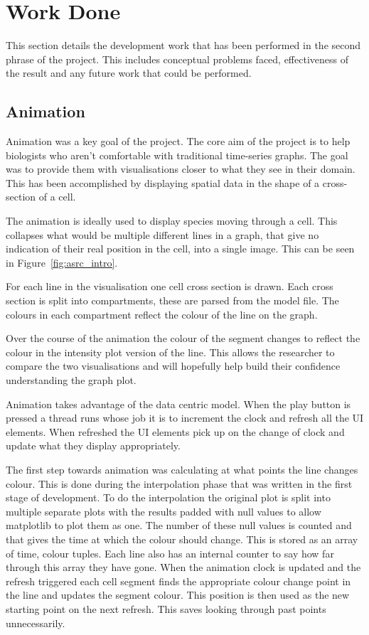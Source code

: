 \chapter{Work Done}

This section details the development work that has been performed in the second phrase of the project.  This includes conceptual problems faced, effectiveness of the result and any future work that could be performed.



\section{Animation}

Animation was a key goal of the project.  The core aim of the project is to help biologists who aren't comfortable with traditional time-series graphs.  The goal was to provide them with visualisations closer to what they see in their domain.  This has been accomplished by displaying spatial data in the shape of a cross-section of a cell.

The animation is ideally used to display species moving through a cell.  This collapses what would be multiple different lines in a graph, that give no indication of their real position in the cell, into a single image.  This can be seen in Figure~\ref{fig:asrc_intro}.

For each line in the visualisation one cell cross section is drawn.  Each cross section is split into compartments, these are parsed from the model file.  The colours in each compartment reflect the colour of the line on the graph.

Over the course of the animation the colour of the segment changes to reflect the colour in the intensity plot version of the line.  This allows the researcher to compare the two visualisations and will hopefully help build their confidence understanding the graph plot.

Animation takes advantage of the data centric model.  When the play button is pressed a thread runs whose job it is to increment the clock and refresh all the \ac{UI} elements.  When refreshed the \ac{UI} elements pick up on the change of clock and update what they display appropriately.

The first step towards animation was calculating at what points the line changes colour.  This is done during the interpolation phase that was written in the first stage of development.  To do the interpolation the original plot is split into multiple separate plots with the results padded with null values to allow matplotlib to plot them as one.  The number of these null values is counted and that gives the time at which the colour should change.  This is stored as an array of time, colour tuples.  Each line also has an internal counter to say how far through this array they have gone.  When the animation clock is updated and the refresh triggered each cell segment finds the appropriate colour change point in the line and updates the segment colour.  This position is then used as the new starting point on the next refresh.  This saves looking through past points unnecessarily.


